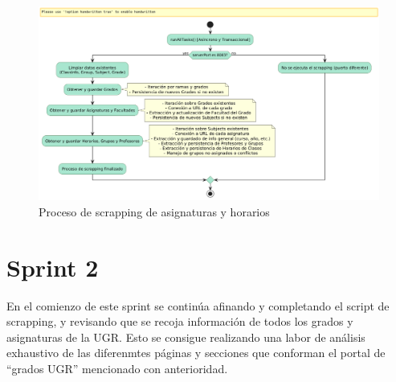 \begin{figure}[H]
    \centering
    \includegraphics[width=1\textwidth, trim=0 0 0 45, clip]{figures/07_scrapping.png}
    \caption{Proceso de scrapping de asignaturas y horarios}
    \label{fig:scrapping-process}
\end{figure}

\section{Sprint 2}

En el comienzo de este sprint se continúa afinando y completando el script de scrapping, y revisando que se recoja información de todos los grados y asignaturas de la UGR. Esto se consigue realizando una labor de análisis exhaustivo de las diferenmtes páginas y secciones que conforman el portal de ``grados UGR'' mencionado con anterioridad.
